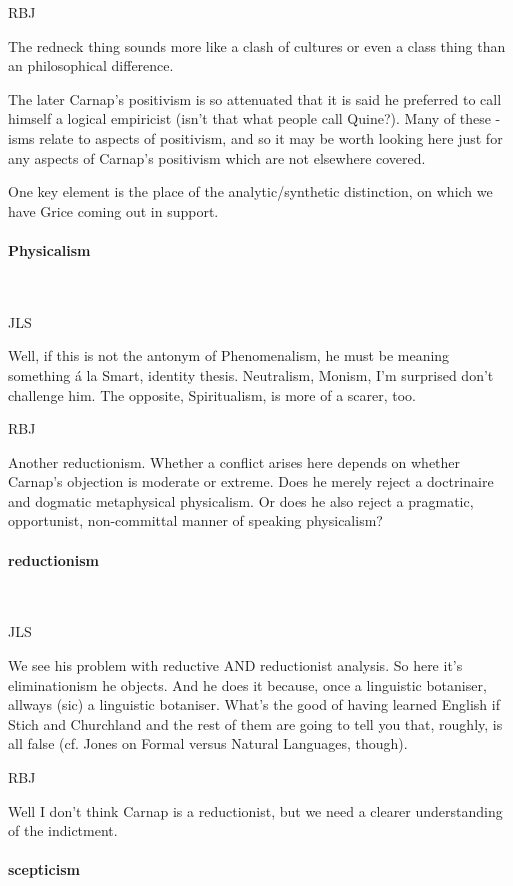 \documentclass[10pt,titlepage]{book}
\begin{document}
RBJ

The redneck thing sounds more like a clash of cultures or even a class thing than an philosophical difference.

The later Carnap's positivism is so attenuated that it is said he preferred to call himself a logical empiricist (isn't that what people call Quine?).
Many of these -isms relate to aspects of positivism, and so it may be worth looking here just for any aspects of Carnap's positivism which are not elsewhere covered.

One key element is the place of the analytic/synthetic distinction, on which we have Grice coming out in support.
 
\paragraph{Physicalism}\ 

JLS

Well, if this is not the antonym of Phenomenalism, he must be  
meaning something \'a la Smart, identity thesis. Neutralism, Monism, I'm 
surprised  don't challenge him. The opposite, Spiritualism, is more of a scarer, 
too.

RBJ

Another reductionism.
Whether a conflict arises here depends on whether Carnap's objection is moderate or extreme.
Does he merely reject a doctrinaire and dogmatic metaphysical physicalism.
Or does he also reject a pragmatic, opportunist, non-committal manner of speaking physicalism?

\paragraph{reductionism}\ 

JLS

We see his problem with reductive AND reductionist analysis.  
So here it's eliminationism he objects. And he does it because, once a  
linguistic botaniser, allways (sic) a linguistic botaniser. What's the good of  
having learned English if Stich and Churchland and the rest of them are 
going to  tell you that, roughly, is all false (cf. Jones on Formal versus 
Natural  Languages, though).

RBJ

Well I don't think Carnap is a reductionist, but we need a clearer understanding of the indictment.

\paragraph{scepticism}\ 
\end{document}
